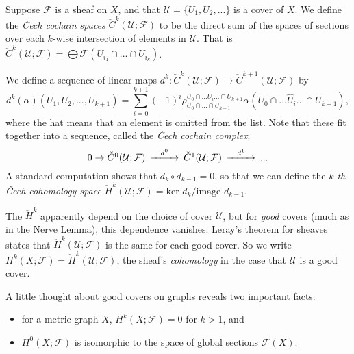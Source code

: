 \documentclass{amsart}
\theoremstyle{plain}
\theoremstyle{definition}
\begin{document}
Suppose $\mathcal{F}$ is a sheaf on $X$, and that $\mathcal{U}=\{U_1,U_2,...\}$ is a cover
of $X$.  We define the {\it \v{C}ech cochain spaces}
$\check{C}^k(\mathcal{U};\mathcal{F})$ to be the direct sum of
the spaces of sections over each $k$-wise intersection of elements in
$\mathcal{U}$.  That is 
$\check{C}^k(\mathcal{U};\mathcal{F})=\bigoplus \mathcal{F}(U_{i_1} \cap ... \cap U_{i_k})$.

We define a sequence of linear maps $d^k:\check{C}^k(\mathcal{U};\mathcal{F}) \to \check{C}^{k+1}(\mathcal{U};\mathcal{F})$
by 
\begin{equation*}
d^k(\alpha)(U_1,U_2,...,U_{k+1})=\sum_{i=0}^{k+1} (-1)^i \rho^{U_0
  \cap ... \hat{U}_i ... \cap U_{k+1}}_{U_0 \cap ... \cap U_{k+1}}
\alpha(U_0
  \cap ... \hat{U}_i ... \cap U_{k+1}),
\end{equation*}
where the hat means that an element is omitted from the list.
Note that these fit together into a sequence, called the {\it \v{C}ech
cochain complex}: 
\begin{equation*}
\begin{CD}
0 \to \check{C}^0(\mathcal{U};\mathcal{F}) @>d^0>> \check{C}^1(\mathcal{U};\mathcal{F}) @>d^1>> ...
\end{CD}
\end{equation*}
A standard computation shows that $d_k \circ d_{k-1} = 0$, so that we can define
the {\it $k$-th \v{C}ech cohomology space}
$\check{H}^k(\mathcal{U};\mathcal{F}) = \text{ker } d_k / \text{image } d_{k-1}.$

The $\check{H}^k$ apparently depend on the choice of cover
$\mathcal{U}$, but for {\it good} covers (much as in the Nerve Lemma),
this dependence vanishes. Leray's theorem for sheaves states that
$\check{H}^k(\mathcal{U};\mathcal{F})$ is the same for each good
cover.  So we write
$H^k(X;\mathcal{F})=\check{H}^k(\mathcal{U};\mathcal{F})$, the sheaf's
{\it cohomology} in the case that $\mathcal{U}$ is a good cover.

A little thought about good covers on graphs reveals two important facts:
\begin{itemize}
\item for a metric graph $X$, $H^k(X;\mathcal{F})=0$ for $k>1$, and 
\item $H^0(X;\mathcal{F})$ is isomorphic to the space of global sections $\mathcal{F}(X)$.  
\end{itemize}
\end{document}
